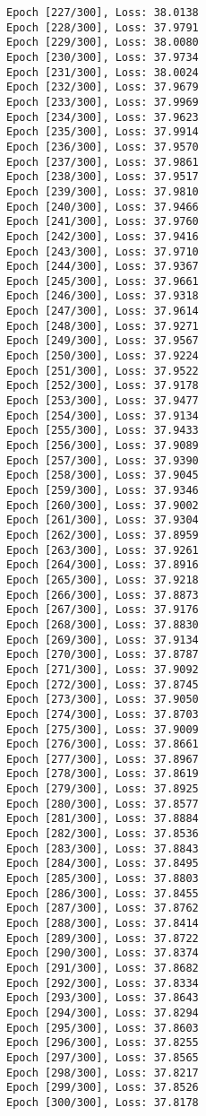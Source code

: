 \documentclass[11pt]{article}
\begin{document}
\begin{Verbatim}[commandchars=\\\{\}]
Epoch [227/300], Loss: 38.0138
Epoch [228/300], Loss: 37.9791
Epoch [229/300], Loss: 38.0080
Epoch [230/300], Loss: 37.9734
Epoch [231/300], Loss: 38.0024
Epoch [232/300], Loss: 37.9679
Epoch [233/300], Loss: 37.9969
Epoch [234/300], Loss: 37.9623
Epoch [235/300], Loss: 37.9914
Epoch [236/300], Loss: 37.9570
Epoch [237/300], Loss: 37.9861
Epoch [238/300], Loss: 37.9517
Epoch [239/300], Loss: 37.9810
Epoch [240/300], Loss: 37.9466
Epoch [241/300], Loss: 37.9760
Epoch [242/300], Loss: 37.9416
Epoch [243/300], Loss: 37.9710
Epoch [244/300], Loss: 37.9367
Epoch [245/300], Loss: 37.9661
Epoch [246/300], Loss: 37.9318
Epoch [247/300], Loss: 37.9614
Epoch [248/300], Loss: 37.9271
Epoch [249/300], Loss: 37.9567
Epoch [250/300], Loss: 37.9224
Epoch [251/300], Loss: 37.9522
Epoch [252/300], Loss: 37.9178
Epoch [253/300], Loss: 37.9477
Epoch [254/300], Loss: 37.9134
Epoch [255/300], Loss: 37.9433
Epoch [256/300], Loss: 37.9089
Epoch [257/300], Loss: 37.9390
Epoch [258/300], Loss: 37.9045
Epoch [259/300], Loss: 37.9346
Epoch [260/300], Loss: 37.9002
Epoch [261/300], Loss: 37.9304
Epoch [262/300], Loss: 37.8959
Epoch [263/300], Loss: 37.9261
Epoch [264/300], Loss: 37.8916
Epoch [265/300], Loss: 37.9218
Epoch [266/300], Loss: 37.8873
Epoch [267/300], Loss: 37.9176
Epoch [268/300], Loss: 37.8830
Epoch [269/300], Loss: 37.9134
Epoch [270/300], Loss: 37.8787
Epoch [271/300], Loss: 37.9092
Epoch [272/300], Loss: 37.8745
Epoch [273/300], Loss: 37.9050
Epoch [274/300], Loss: 37.8703
Epoch [275/300], Loss: 37.9009
Epoch [276/300], Loss: 37.8661
Epoch [277/300], Loss: 37.8967
Epoch [278/300], Loss: 37.8619
Epoch [279/300], Loss: 37.8925
Epoch [280/300], Loss: 37.8577
Epoch [281/300], Loss: 37.8884
Epoch [282/300], Loss: 37.8536
Epoch [283/300], Loss: 37.8843
Epoch [284/300], Loss: 37.8495
Epoch [285/300], Loss: 37.8803
Epoch [286/300], Loss: 37.8455
Epoch [287/300], Loss: 37.8762
Epoch [288/300], Loss: 37.8414
Epoch [289/300], Loss: 37.8722
Epoch [290/300], Loss: 37.8374
Epoch [291/300], Loss: 37.8682
Epoch [292/300], Loss: 37.8334
Epoch [293/300], Loss: 37.8643
Epoch [294/300], Loss: 37.8294
Epoch [295/300], Loss: 37.8603
Epoch [296/300], Loss: 37.8255
Epoch [297/300], Loss: 37.8565
Epoch [298/300], Loss: 37.8217
Epoch [299/300], Loss: 37.8526
Epoch [300/300], Loss: 37.8178
    \end{Verbatim}
\end{document}
